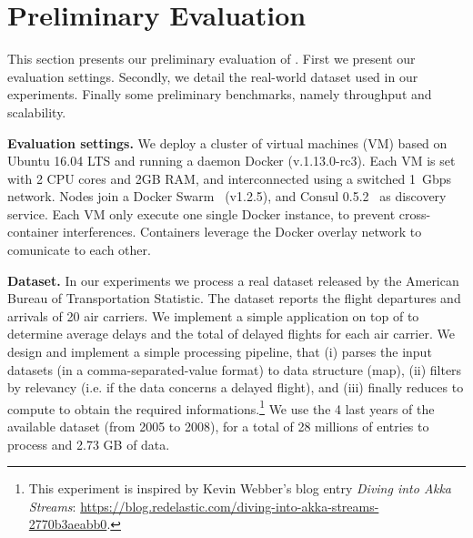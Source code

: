\section{Preliminary Evaluation}
\label{sec:eval}

This section presents our preliminary evaluation of \SYS.
First we present our evaluation settings.
Secondly, we detail the real-world dataset used in our experiments. 
Finally some preliminary benchmarks, namely throughput and scalability.

\textbf{Evaluation settings.} We deploy a cluster of virtual machines (VM) based on Ubuntu 16.04 LTS and running a daemon Docker (v.1.13.0-rc3).
Each VM is set with 2 CPU cores and 2GB RAM, and interconnected using a switched 1~Gbps network.
Nodes join a Docker Swarm~\cite{} (v1.2.5), and Consul 0.5.2~\cite{} as discovery service.
Each VM only execute one single Docker instance, to prevent cross-container interferences. 
Containers leverage the Docker overlay network to comunicate to each other.

\textbf{Dataset.} In our experiments we process a real dataset released by the American Bureau of Transportation Statistic\cite{rita:bts}.
The dataset reports the flight departures and arrivals of 20 air carriers\cite{statistical_computing:data}.%
We implement a simple application on top of \SYS to determine average delays and the total of delayed flights for each air carrier.
We design and implement a simple processing pipeline, that (i) parses the input datasets (in a comma-separated-value format) to data structure (map), (ii) filters by relevancy (i.e. if the data concerns a delayed flight), and (iii) finally reduces to compute to obtain the required informations.\footnote{This experiment is inspired by Kevin Webber's blog entry \emph{Diving into Akka Streams}: \url{https://blog.redelastic.com/diving-into-akka-streams-2770b3aeabb0}.}
We use the 4 last years of the available dataset (from 2005 to 2008), for a total of 28 millions of entries to process and 2.73 GB of data.

